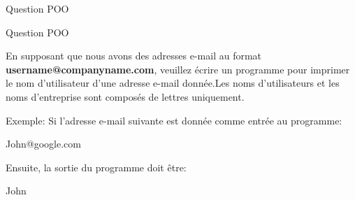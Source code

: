 \question
Question POO
%
%
%
%
%
%

\question
Question POO


\question
En supposant que nous avons des adresses e-mail au format \textbf{username@companyname.com}, veuillez écrire un programme pour imprimer le nom d'utilisateur d'une adresse e-mail donnée.Les noms d'utilisateurs et les noms d'entreprise sont composés de lettres uniquement.\newline

Exemple:\newline
Si l'adresse e-mail suivante est donnée comme entrée au programme:\newline

John@google.com\newline

Ensuite, la sortie du programme doit être:\newline

John\newline

